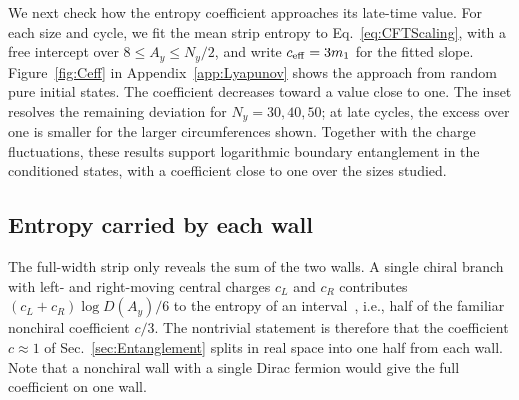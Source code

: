 \documentclass[aps,prb,10pt,twocolumn,superscriptaddress,longbibliography,floatfix]{revtex4-2}
\newcommand{\newtext}[1]{{\color{blue}#1}}
\newcommand{\claudeadd}[1]{{\color{orange}#1}}
\begin{document}
{\color{blue}
We next check how the entropy coefficient approaches its late-time value. For each size and cycle, we fit the mean strip entropy to Eq.~\eqref{eq:CFTScaling}, with a free intercept over $8\leq A_y\leq N_y/2$, and write $c_{\rm eff}=3m_1$ for the fitted slope. Figure~\ref{fig:Ceff} in Appendix~\ref{app:Lyapunov} shows the approach from random pure initial states. The coefficient decreases toward a value close to one. The inset resolves the remaining deviation for $N_y=30,40,50$; at late cycles, the excess over one is smaller for the larger circumferences shown. \claudeadd{Together with the charge fluctuations, these results support logarithmic boundary entanglement in the conditioned states, with a coefficient close to one over the sizes studied.}
}


{\color{blue}\subsection{Entropy carried by each wall}
\label{sec:ChiralCentralCharge}}

The full-width strip only reveals the sum of the two walls. A single chiral branch with left- and right-moving central charges $c_L$ and $c_R$ contributes \newtext{$(c_L+c_R)\log D(A_y)/6$} to the entropy of an interval~\cite{CalabreseCardy2004,CastroDetournayIqbalPerlmutter2014}, i.e., half of the familiar nonchiral coefficient $c/3$. The nontrivial statement is therefore that the coefficient $c\approx1$ of Sec.~\ref{sec:Entanglement} splits in real space into one half from each wall. Note that a nonchiral wall with a single Dirac fermion would give the full coefficient on one wall.
\end{document}
